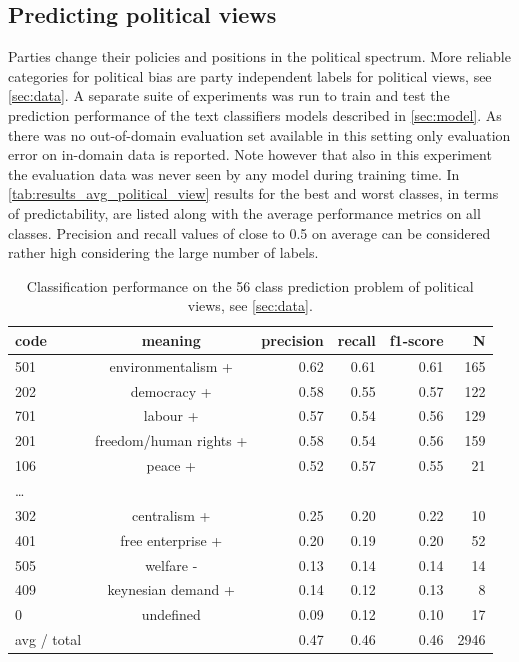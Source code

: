 \documentclass[runningheads,a4paper]{llncs}
\begin{document}
\subsection{Predicting political views}
Parties change their policies and positions in the political spectrum. More reliable categories for political bias are party independent labels for political views, see \autoref{sec:data}. A separate suite of experiments was run to train and test the prediction performance of the text classifiers models described in \autoref{sec:model}. As there was no out-of-domain evaluation set available in this setting only evaluation error on in-domain data is reported. Note however that also in this experiment the evaluation data was never seen by any model during training time.
In \autoref{tab:results_avg_political_view} results for the best and worst classes, in terms of predictability, are listed along with the average performance metrics on all classes. 
Precision and recall values of close to 0.5 on average can be considered rather high considering the large number of labels. \\

\begin{table}[t]
\begin{center}
\begin{tabular}{lcrrrr}
code & meaning  &      precision    &recall &  f1-score  & N\\
\hline\hline
%
       501  & environmentalism + &      0.62   &   0.61 &     0.61  &     165\\
        202 &   democracy + &   0.58  &    0.55   &   0.57   &    122\\
        701    & labour +&  0.57  &    0.54   &   0.56      & 129\\
                201    &freedom/human rights +  & 0.58   &   0.54   &   0.56   &    159\\
         106   & peace + & 0.52&      0.57   &   0.55    &    21\\
\dots\\
        302     &centralism + & 0.25     & 0.20  &    0.22  &      10\\
        401    &  free enterprise + &0.20    &  0.19    &  0.20   &     52\\
        505    &welfare - &  0.13   &   0.14   &   0.14   &     14\\
        409    & keynesian demand +&  0.14  &    0.12  &    0.13   &      8\\
            0    & undefined &  0.09  &    0.12   &   0.10    &    17\\
avg / total  &  &  0.47    &  0.46 &     0.46 &     2946\\
%
\end{tabular}
\end{center}
\caption{
\label{tab:results_avg_political_view}
Classification performance on the 56 class prediction problem of political views, see \autoref{sec:data}.
}
\end{table}
\end{document}
